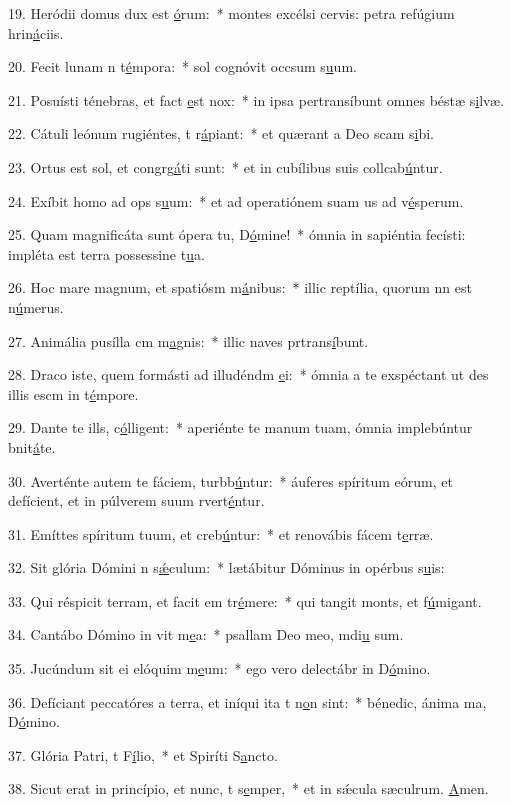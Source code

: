19. Heródii domus dux est \uline{ó}rum:~* montes excélsi cervis: petra refúgium hrin\uline{á}ciis.\par 
20. Fecit lunam n t\uline{é}mpora:~* sol cognóvit occsum s\uline{u}um.\par 
21. Posuísti ténebras, et fact \uline{e}st nox:~* in ipsa pertransíbunt omnes béstæ s\uline{i}lvæ.\par 
22. Cátuli leónum rugiéntes, t r\uline{á}piant:~* et quærant a Deo scam s\uline{i}bi.\par 
23. Ortus est sol, et congrg\uline{á}ti sunt:~* et in cubílibus suis collcab\uline{ú}ntur.\par 
24. Exíbit homo ad ops s\uline{u}um:~* et ad operatiónem suam us ad v\uline{é}sperum.\par 
25. Quam magnificáta sunt ópera tu, D\uline{ó}mine!~* ómnia in sapiéntia fecísti: impléta est terra possessine t\uline{u}a.\par 
26. Hoc mare magnum, et spatiósm m\uline{á}nibus:~* illic reptília, quorum nn est n\uline{ú}merus.\par 
27. Animália pusílla cm m\uline{a}gnis:~* illic naves prtrans\uline{í}bunt.\par 
28. Draco iste, quem formásti ad illudéndm \uline{e}i:~* ómnia a te exspéctant ut des illis escm in t\uline{é}mpore.\par 
29. Dante te ills, c\uline{ó}lligent:~* aperiénte te manum tuam, ómnia implebúntur bnit\uline{á}te.\par 
30. Averténte autem te fáciem, turbb\uline{ú}ntur:~* áuferes spíritum eórum, et defícient, et in púlverem suum rvert\uline{é}ntur.\par 
31. Emíttes spíritum tuum, et creb\uline{ú}ntur:~* et renovábis fácem t\uline{e}rræ.\par 
32. Sit glória Dómini n s\uline{ǽ}culum:~* lætábitur Dóminus in opérbus s\uline{u}is:\par 
33. Qui réspicit terram, et facit em tr\uline{é}mere:~* qui tangit monts, et f\uline{ú}migant.\par 
34. Cantábo Dómino in vit m\uline{e}a:~* psallam Deo meo, mdi\uline{u} sum.\par 
35. Jucúndum sit ei elóquim m\uline{e}um:~* ego vero delectábr in D\uline{ó}mino.\par 
36. Defíciant peccatóres a terra, et iníqui ita t n\uline{o}n sint:~* bénedic, ánima ma, D\uline{ó}mino.\par 
37. Glória Patri, t F\uline{í}lio,~* et Spiríti S\uline{a}ncto.\par 
38. Sicut erat in princípio, et nunc, t s\uline{e}mper,~* et in sǽcula sæculrum. \uline{A}men.\par 
